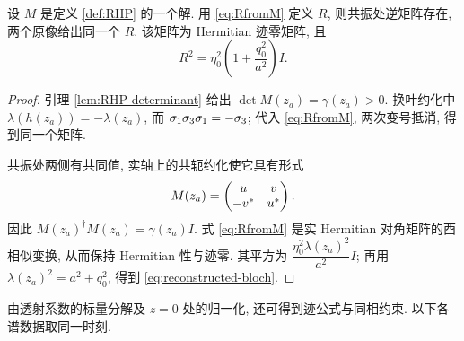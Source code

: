\begin{lemma}\label{lem:medium-reduction}
设 $M$ 是定义 \ref{def:RHP} 的一个解.
用 \eqref{eq:RfromM} 定义 $R$, 则共振处逆矩阵存在, 两个原像给出同一个 $R$.
该矩阵为 Hermitian 迹零矩阵, 且
\begin{equation}\label{eq:reconstructed-bloch}
R^2=\eta_0^2\left(1+\dfrac{q_0^2}{a^2}\right)I.
\end{equation}
\end{lemma}
\begin{proof}
引理 \ref{lem:RHP-determinant} 给出 $\det M(z_a)=\gamma(z_a)>0$.
换叶约化中 $\lambda(h(z_a))=-\lambda(z_a)$,
而 $\sigma_1\sigma_3\sigma_1=-\sigma_3$; 代入 \eqref{eq:RfromM}, 两次变号抵消, 得到同一个矩阵.

共振处两侧有共同值, 实轴上的共轭约化使它具有形式
\begin{equation*}
M(z_a)=\begin{pmatrix}u&v\\-{v}^{*}&{u}^{*}\end{pmatrix}.
\end{equation*}
因此 $M(z_a)^\dagger M(z_a)=\gamma(z_a)I$.
式 \eqref{eq:RfromM} 是实 Hermitian 对角矩阵的酉相似变换,
从而保持 Hermitian 性与迹零. 其平方为
$\dfrac{\eta_0^2\lambda(z_a)^2}{a^2}I$;
再用 $\lambda(z_a)^2=a^2+q_0^2$, 得到 \eqref{eq:reconstructed-bloch}.
\end{proof}

由透射系数的标量分解\cite{Fan2022,ZhangFan2020}及 $z=0$ 处的归一化, 还可得到迹公式与同相约束. 以下各谱数据取同一时刻.

